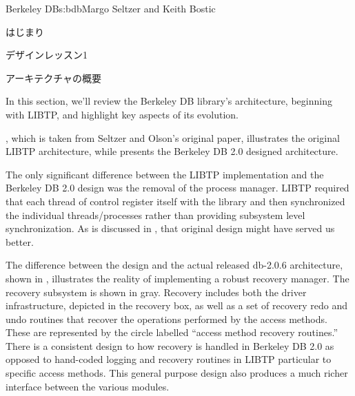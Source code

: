 \begin{aosachapter}{Berkeley DB}{s:bdb}{Margo Seltzer and Keith Bostic}
\begin{aosasect1}{はじまり}
\begin{aosabox}{デザインレッスン1}
\end{aosabox}

\end{aosasect1}

\begin{aosasect1}{アーキテクチャの概要}

In this section, we'll review the Berkeley DB library's architecture,
beginning with LIBTP, and highlight key aspects of its evolution.

, which is taken from Seltzer and Olson's
original paper, illustrates the original LIBTP architecture, while
 presents the Berkeley DB 2.0 designed
architecture.



The only significant difference between the LIBTP implementation and
the Berkeley DB 2.0 design was the removal of the process
manager. LIBTP required that each thread of control register itself with the
library and then synchronized the individual threads/processes rather
than providing subsystem level synchronization. As is discussed in
, that original design might have served us
better.


The difference between the design and the actual released db-2.0.6
architecture, shown in , illustrates the
reality of implementing a robust recovery manager. The recovery
subsystem is shown in gray. Recovery includes both the driver
infrastructure, depicted in the recovery box, as well as a set of
recovery redo and undo routines that recover the operations performed
by the access methods. These are represented by the circle labelled
``access method recovery routines.'' There is a consistent design to
how recovery is handled in Berkeley DB 2.0 as opposed to hand-coded
logging and recovery routines in LIBTP particular to specific
access methods.  This
general purpose design also produces a much richer interface between
the various modules.


\end{aosasect1}
\end{aosachapter}
